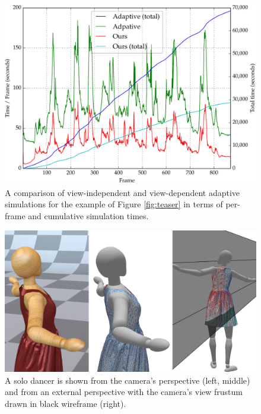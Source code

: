 \documentclass[10pt,journal,compsoc,twoside]{TexInputs/IEEEtran}
\begin{document}
\begin{figure}[t]
    \centering
    \includegraphics[width=1.0\columnwidth]{timings}
    \caption{A comparison of view-independent and view-dependent adaptive simulations for
        the example of Figure \ref{fig:teaser} in terms of per-frame and cumulative simulation times.}
    \label{fig:comparison}
\end{figure}

\begin{figure}[t]
    \centering
    \includegraphics[width=1.0\columnwidth]{solo/solo}
    \caption{A solo dancer is shown from the camera's perspective (left, middle) and from
    an external perspective with the camera's view frustum drawn in black wireframe (right).}
    \label{fig:solo_dancer}
\end{figure}
\end{document}
